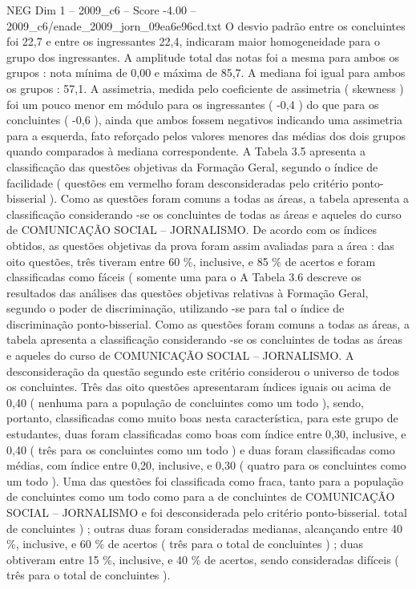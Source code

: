 \begin{textsample}{NEG Dim 1 – 2009\_c6 – Score -4.00 – 2009\_c6/enade\_2009\_jorn\_09ea6e96cd.txt}
O desvio padrão entre os concluintes foi 22,7 e entre os ingressantes 22,4, indicaram maior homogeneidade para o grupo dos ingressantes.
A amplitude total das notas foi a mesma para ambos os grupos : nota mínima de 0,00 e máxima de 85,7.
A mediana foi igual para ambos os grupos : 57,1.
A assimetria, medida pelo coeficiente de assimetria ( skewness ) foi um pouco menor em módulo para os ingressantes ( -0,4 ) do que para os concluintes ( -0,6 ), ainda que ambos fossem negativos indicando uma assimetria para a esquerda, fato reforçado pelos valores menores das médias dos dois grupos quando comparados à mediana correspondente.
A Tabela 3.5 apresenta a classificação das questões objetivas da Formação Geral, segundo o índice de facilidade ( questões em vermelho foram desconsideradas pelo critério ponto-bisserial ).
Como as questões foram comuns a todas as áreas, a tabela apresenta a classificação considerando -se os concluintes de todas as áreas e aqueles do curso de COMUNICAÇÃO SOCIAL – JORNALISMO.
De acordo com os índices obtidos, as questões objetivas da prova foram assim avaliadas para a área : das oito questões, três tiveram entre 60 \%, inclusive, e 85 \% de acertos e foram classificadas como fáceis ( somente uma para o A Tabela 3.6 descreve os resultados das análises das questões objetivas relativas à Formação Geral, segundo o poder de discriminação, utilizando -se para tal o índice de discriminação ponto-bisserial.
Como as questões foram comuns a todas as áreas, a tabela apresenta a classificação considerando -se os concluintes de todas as áreas e aqueles do curso de COMUNICAÇÃO SOCIAL – JORNALISMO.
A desconsideração da questão segundo este critério considerou o universo de todos os concluintes.
Três das oito questões apresentaram índices iguais ou acima de 0,40 ( nenhuma para a população de concluintes como um todo ), sendo, portanto, classificadas como muito boas nesta característica, para este grupo de estudantes, duas foram classificadas como boas com índice entre 0,30, inclusive, e 0,40 ( três para os concluintes como um todo ) e duas foram classificadas como médias, com índice entre 0,20, inclusive, e 0,30 ( quatro para os concluintes como um todo ).
Uma das questões foi classificada como fraca, tanto para a população de concluintes como um todo como para a de concluintes de COMUNICAÇÃO SOCIAL – JORNALISMO e foi desconsiderada pelo critério ponto-bisserial. total de concluintes ) ; outras duas foram consideradas medianas, alcançando entre 40 \%, inclusive, e 60 \% de acertos ( três para o total de concluintes ) ; duas obtiveram entre 15 \%, inclusive, e 40 \% de acertos, sendo consideradas difíceis ( três para o total de concluintes ).

\end{textsample}
